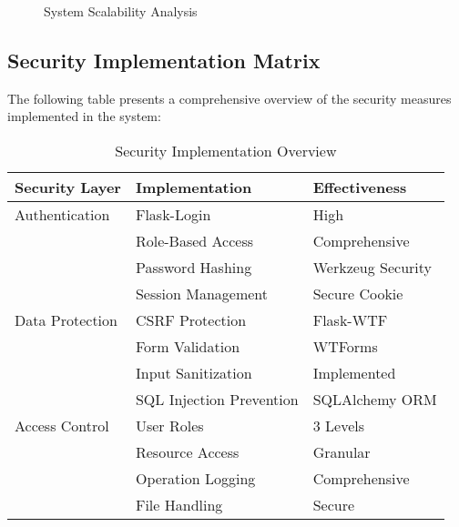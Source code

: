 \documentclass{article}
\begin{document}
\begin{figure}[h]
\centering
{}
\caption{System Scalability Analysis}
\end{figure}

\subsection{Security Implementation Matrix}

The following table presents a comprehensive overview of the security measures implemented in the system:

\begin{table}[h]
\centering
\begin{tabular}{@{}lll@{}}
\toprule
\textbf{Security Layer} & \textbf{Implementation} & \textbf{Effectiveness} \\
\midrule
\rowcolor{lightblue!30}
Authentication & Flask-Login & High \\
& Role-Based Access & Comprehensive \\
& Password Hashing & Werkzeug Security \\
& Session Management & Secure Cookie \\
\midrule
\rowcolor{lightgreen!30}
Data Protection & CSRF Protection & Flask-WTF \\
& Form Validation & WTForms \\
& Input Sanitization & Implemented \\
& SQL Injection Prevention & SQLAlchemy ORM \\
\midrule
\rowcolor{lightred!30}
Access Control & User Roles & 3 Levels \\
& Resource Access & Granular \\
& Operation Logging & Comprehensive \\
& File Handling & Secure \\
\bottomrule
\end{tabular}
\caption{Security Implementation Overview}
\end{table}
\end{document}
